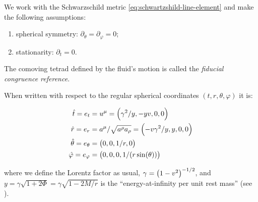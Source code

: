 \documentclass[main.tex]{subfiles}
\begin{document}
We work with the Schwarzschild metric \eqref{eq:schwartzshild-line-element} and make the following assumptions:

\begin{enumerate}
  \item spherical symmetry: \(\partial_\theta = \partial_\varphi = 0\);
  \item stationarity: \(\partial_t = 0\).
\end{enumerate}

The comoving tetrad defined by the fluid's motion is called the \emph{fiducial congruence reference}.

\begin{claim}
When written with respect to the regular spherical coordinates \((t, r, \theta, \varphi)\) it is:

\begin{subequations} \label{eq:fiducial-frame}
    \begin{align}
        \hat{t} = e_t &= u^\mu = \qty(\gamma^2 / y, -yv, 0,0)  \\
        \hat{r} = e_r &= a^\mu / \sqrt{a^\rho a_\rho} = \qty(-v \gamma^2 /y, y, 0, 0) \\
        \hat{\theta} =  e_\theta &= \qty(0,0, 1/r, 0)  \\
        \hat{\varphi} =  e_ \varphi &= \qty(0,0,0, 1/(r \sin(\theta)))
    \end{align}
\end{subequations}

where we define the Lorentz factor as usual, $\gamma = \qty(1-v^2)^{-1/2}$, and $y=\gamma \sqrt{1+2\Phi} = \gamma \sqrt{1 - 2M/r} $ is the ``energy-at-infinity per unit rest mass'' (see \cite[equation 3]{ThorneFLammmangZytkow:1981feb}).
\end{claim}
\end{document}
